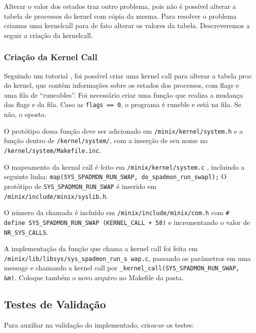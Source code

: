 \documentclass[12pt,journal,compsoc]{IEEEtran}
\begin{document}
	Alterar o valor dos estados traz outro problema, pois não é possível alterar a tabela de processos do kernel com cópia da mesma. Para resolver o problema criamos uma kernelcall para de fato alterar os valores da tabela. Descreveremos a seguir a criação da kernelcall.

\subsubsection{Criação da Kernel Call}

Seguindo um tutorial \cite{criar_kernel_call:wikiMinix3}, foi possível criar uma kernel call para alterar a tabela proc do kernel, que contém informações sobre os estados dos processos, com flags e uma fila de “runeables”. Foi necessário criar uma função que realiza a mudança das flags e da fila. Caso as \texttt{flags == 0}, o programa é runeble e está na fila. Se não, o oposto.

O protótipo dessa função deve ser adicionado em \texttt{/minix/kernel/system.h} e a função dentro de \texttt{/kernel/system/}, com a inserção de seu nome no \texttt{/kernel/system/Makefile.inc}.

O mapeamento da kernal call é feito em \texttt{/minix/kernel/system.c} , incluindo a seguinte linha: \texttt{map(SYS\_SPADMON\_RUN\_SWAP, do\_spadmon\_run\_swapl);} O protótipo de \texttt{SYS\_SPADMON\_RUN\_SWAP} é inserido em \texttt{/minix/include/minix/syslib.h}.

O número da chamada é incluído em \texttt{/minix/include/minix/com.h} com \texttt{\# define SYS\_SPADMON\_RUN\_SWAP (KERNEL\_CALL + 58)} e incrementando o valor de \texttt{NR\_SYS\_CALLS}.

A implementação da função que chama a kernel call foi feita em \texttt{/minix/lib/libsys/sys\_spadmon\_run\_s wap.c}, passando os parâmetros em uma message e chamando a kernel call por \texttt{\_kernel\_call(SYS\_SPADMON\_RUN\_SWAP, \&m)}. Coloque também o novo arquivo no Makefile da pasta.

\subsection{Testes de Validação}
Para auxiliar na validação do implementado, criou-se os testes:
\end{document}

